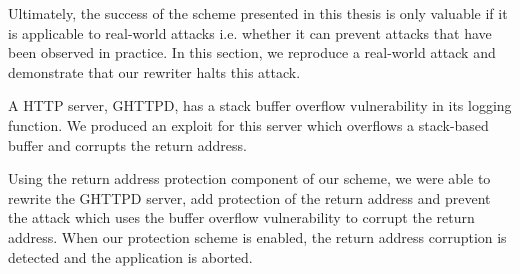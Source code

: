 Ultimately, the success of the scheme presented in this thesis is only valuable if it is applicable
to real-world attacks i.e. whether it can prevent attacks that have been observed in practice. In
this section, we reproduce a real-world attack and demonstrate that our rewriter halts this attack.

A HTTP server, GHTTPD, has a stack buffer overflow vulnerability in its logging function. We
produced an exploit for this server which overflows a stack-based buffer and corrupts the return
address.

Using the return address protection component of our scheme, we were able to rewrite the GHTTPD
server, add protection of the return address and prevent the attack which uses the buffer overflow
vulnerability to corrupt the return address. When our protection scheme is enabled, the return
address corruption is detected and the application is aborted.
